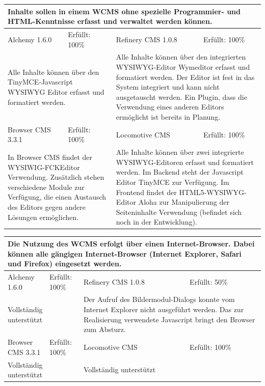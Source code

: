 \begin{tabular}[!ht]{|l|l|l|l|}
\hline
\multicolumn{4}{|p{15cm}|}{\textbf{Inhalte sollen in einem WCMS ohne spezielle Programmier- und HTML-Kenntnisse erfasst und verwaltet werden können.}} \\
\hline
  Alchemy 1.6.0 & \cellcolor{green}Erfüllt: 100\% & Refinery CMS 1.0.8 & \cellcolor{green}Erfüllt: 100\% \\
  \hline
  \multicolumn{2}{|p{7.5cm}|}{Alle Inhalte können über den TinyMCE-Javascript WYSIWYG Editor erfasst und formatiert werden.}
   & \multicolumn{2}{p{7.5cm}|}{Alle Inhalte können über den integrierten WYSIWYG-Editor Wymeditor erfasst und formatiert werden. Der Editor ist fest in das System integriert und kann nicht ausgetauscht werden. Ein Plugin, dass die Verwendung eines anderen Editors ermöglicht ist bereits in Planung.} \\
  \hline
  Browser CMS 3.3.1 & \cellcolor{green}Erfüllt: 100\% & Locomotive CMS & \cellcolor{green}Erfüllt: 100\% \\
  \hline
  \multicolumn{2}{|p{7.5cm}|}{In Browser CMS findet der WYSIWIG-FCKEditor Verwendung. Zusätzlich stehen verschiedene Module zur Verfügung, die einen Austausch des Editors gegen andere Lösungen ermöglichen.} & \multicolumn{2}{p{7.5cm}|}{Alle Inhalte können über zwei integrierte WYSIWYG-Editoren erfasst und formatiert werden. Im Backend steht der Javascript Editor TinyMCE zur Verfügung. Im Frontend findet der HTML5-WYSIWYG-Editor Aloha zur Manipulierung der Seiteninhalte Verwendung (befindet sich noch in der Entwicklung).} \\
\hline
\end{tabular}
\newline
\newline
\newline
\begin{tabular}[!ht]{|l|l|l|l|}
\hline
\multicolumn{4}{|p{15cm}|}{\textbf{Die Nutzung des WCMS erfolgt über einen Internet-Browser. Dabei können alle gängigen Internet-Browser (Internet Explorer, Safari und Firefox) eingesetzt werden.}} \\
\hline
  Alchemy 1.6.0 & \cellcolor{green}Erfüllt: 100\% & Refinery CMS 1.0.8 & \cellcolor{yellow}Erfüllt: 50\% \\
  \hline
  \multicolumn{2}{|p{7.5cm}|}{Vollständig unterstützt}
   & \multicolumn{2}{p{7.5cm}|}{Der Aufruf des Bildermodul-Dialogs konnte vom Internet Explorer nicht ausgeführt werden. Das zur Realisierung verwendete Javascript bringt den Browser zum Absturz.} \\
  \hline
  Browser CMS 3.3.1 & \cellcolor{green}Erfüllt: 100\% & Locomotive CMS & \cellcolor{green}Erfüllt: 100\% \\
  \hline
  \multicolumn{2}{|p{7.5cm}|}{Vollständig unterstützt} & \multicolumn{2}{p{7.5cm}|}{Vollständig unterstützt} \\
\hline
\end{tabular}
